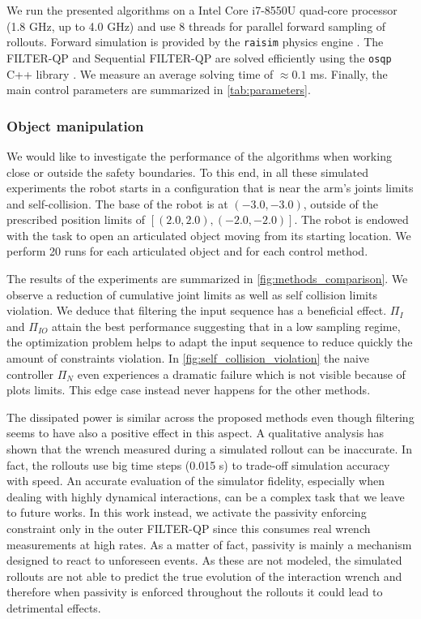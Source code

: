 We run the presented algorithms on a Intel Core i7-8550U quad-core processor (1.8 GHz, up to 4.0 GHz) and use 8 threads for parallel forward sampling of rollouts. Forward simulation is provided by the \texttt{raisim} physics engine \cite{raisim}. The FILTER-QP and Sequential FILTER-QP are solved efficiently using the \texttt{osqp} C++ library \cite{osqp}. We measure an average solving time of $\approx 0.1$ ms. Finally, the main control parameters are summarized in \tab \ref{tab:parameters}.  


\vspace{0.3cm}
\subsubsection{Object manipulation}
We would like to investigate the performance of the algorithms when working close or outside the safety boundaries. To this end, in all these simulated experiments the robot starts in a configuration that is near the arm's joints limits and self-collision. The base of the robot is at $(-3.0, -3.0)$, outside of the prescribed position limits of $[(2.0, 2.0), (-2.0, -2.0)]$. The robot is endowed with the task to open an articulated object moving from its starting location. We perform 20 runs for each articulated object and for each control method.

The results of the experiments are summarized in \fig \ref{fig:methods_comparison}. We observe a reduction of cumulative joint limits as well as self collision limits violation. We deduce that filtering the input sequence has a beneficial effect. $\Pi_{I}$ and $\Pi_{IO}$ attain the best performance suggesting that in a low sampling regime, the optimization problem helps to adapt the input sequence to reduce quickly the amount of constraints violation. In \fig \ref{fig:self_collision_violation} the naive controller $\Pi_{N}$ even experiences a dramatic failure which is not visible because of plots limits. This edge case instead never happens for the other methods. 

The dissipated power is similar across the proposed methods even though filtering seems to have also a positive effect in this aspect. A qualitative analysis has shown that the wrench measured during a simulated rollout can be inaccurate. In fact, the rollouts use big time steps (0.015 s) to trade-off simulation accuracy with speed. An accurate evaluation of the simulator fidelity, especially when dealing with highly dynamical interactions, can be a complex task that we leave to future works. In this work instead, we activate the passivity enforcing constraint only in the outer FILTER-QP since this consumes real wrench measurements at high rates. As a matter of fact, passivity is mainly a mechanism designed to react to unforeseen events. As these are not modeled, the simulated rollouts are not able to predict the true evolution of the interaction wrench and therefore when passivity is enforced throughout the rollouts it could lead to detrimental effects.

